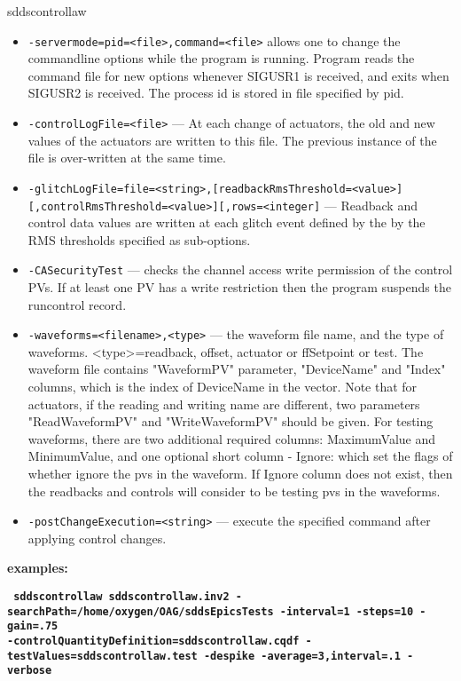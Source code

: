 \begin{sddsprog}{sddscontrollaw}
\begin{itemize}
  \item {\tt -servermode=pid=<file>,command=<file>}     allows one to change the commandline options while the program is
               running. Program reads the command file for new options whenever
               SIGUSR1 is received, and exits when SIGUSR2 is received.
               The process id is stored in file specified by pid.
  \item {\tt -controlLogFile=<file>} --- At each change of actuators, the old and new values of the actuators
               are written to this file. The previous instance of the file
               is over-written at the same time.
  \item {\tt -glitchLogFile=file=<string>,[readbackRmsThreshold=<value>][,controlRmsThreshold=<value>][,rows=<integer]} ---
                  Readback and control data values
               are written at each glitch event defined by the
               by the RMS thresholds specified as sub-options.
  \item {\tt -CASecurityTest} --- checks the channel access write permission of the control PVs.
               If at least one PV has a write restriction then the program suspends
               the runcontrol record.
  \item {\tt -waveforms=<filename>,<type>} --- the waveform file name, and the type of
               waveforms. <type>=readback, offset, actuator or ffSetpoint or test.
               The waveform file contains "WaveformPV" parameter,
               "DeviceName" and "Index" columns, which is the index of DeviceName in
               the vector. Note that for actuators, if the reading and writing name are
               different, two parameters "ReadWaveformPV" and "WriteWaveformPV"
               should be given. For testing waveforms, there are two additional required columns:
               MaximumValue and MinimumValue, and one optional short column - Ignore:
               which set the flags of whether ignore the pvs in the waveform. If Ignore column
               does not exist, then the readbacks and controls will consider to be testing pvs
               in the waveforms.
  \item {\tt -postChangeExecution=<string>} --- execute the specified command after applying control changes.
\end{itemize}

\item \textbf{examples:}
     \begin{flushleft}{\tt \bf
        sddscontrollaw sddscontrollaw.inv2 -searchPath=/home/oxygen/OAG/sddsEpicsTests -interval=1 -steps=10 -gain=.75 \\
         -controlQuantityDefinition=sddscontrollaw.cqdf -testValues=sddscontrollaw.test -despike -average=3,interval=.1 -verbose
     }\end{flushleft}


\end{sddsprog}
